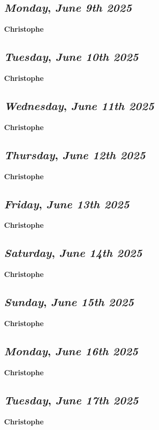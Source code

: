 \def\day{\textit{June 9th 2025}}
\def\weekday{\textit{Monday}}
\subsection*{\weekday, \day}
\textbf {Christophe}

\def\day{\textit{June 10th 2025}}
\def\weekday{\textit{Tuesday}}
\subsection*{\weekday, \day}
\textbf {Christophe}

\def\day{\textit{June 11th 2025}}
\def\weekday{\textit{Wednesday}}
\subsection*{\weekday, \day}
\textbf {Christophe}

\def\day{\textit{June 12th 2025}}
\def\weekday{\textit{Thursday}}
\subsection*{\weekday, \day}
\textbf {Christophe}

\def\day{\textit{June 13th 2025}}
\def\weekday{\textit{Friday}}
\subsection*{\weekday, \day}
\textbf {Christophe}

\def\day{\textit{June 14th 2025}}
\def\weekday{\textit{Saturday}}
\subsection*{\weekday, \day}
\textbf {Christophe}

\def\day{\textit{June 15th 2025}}
\def\weekday{\textit{Sunday}}
\subsection*{\weekday, \day}
\textbf {Christophe}

\def\day{\textit{June 16th 2025}}
\def\weekday{\textit{Monday}}
\subsection*{\weekday, \day}
\textbf {Christophe}

\def\day{\textit{June 17th 2025}}
\def\weekday{\textit{Tuesday}}
\subsection*{\weekday, \day}
\textbf {Christophe}

